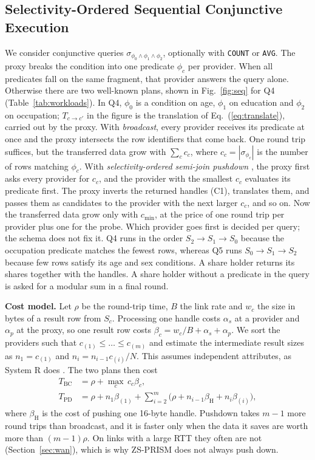 \documentclass[conference]{IEEEtran}
\newcommand{\sys}{ZS-PRISM}
\begin{document}
\subsection{Selectivity-Ordered Sequential Conjunctive Execution}\label{sec:query}
We consider conjunctive queries $\sigma_{\phi_0\wedge\phi_1\wedge\phi_2}$, optionally with \texttt{COUNT} or \texttt{AVG}. The proxy breaks the condition into one predicate $\phi_c$ per provider. When all predicates fall on the same fragment, that provider answers the query alone. Otherwise there are two well-known plans, shown in Fig.~\ref{fig:seq} for Q4 (Table~\ref{tab:workloads}). In Q4, $\phi_0$ is a condition on age, $\phi_1$ on education and $\phi_2$ on occupation; $T_{c\to c'}$ in the figure is the translation of Eq.~(\ref{eq:translate}), carried out by the proxy. With \emph{broadcast}, every provider receives its predicate at once and the proxy intersects the row identifiers that come back. One round trip suffices, but the transferred data grow with $\sum_c c_c$, where $c_c=|\sigma_{\phi_c}|$ is the number of rows matching $\phi_c$. With \emph{selectivity-ordered semi-join pushdown} \cite{bernstein1981semijoin}, the proxy first asks every provider for $c_c$, and the provider with the smallest $c_c$ evaluates its predicate first. The proxy inverts the returned handles (C1), translates them, and passes them as candidates to the provider with the next larger $c_c$, and so on. Now the transferred data grow only with $c_{\min}$, at the price of one round trip per provider plus one for the probe. Which provider goes first is decided per query; the schema does not fix it. Q4 runs in the order $S_2\to S_1\to S_0$ because the occupation predicate matches the fewest rows, whereas Q5 runs $S_0\to S_1\to S_2$ because few rows satisfy its age and sex conditions. A share holder returns its shares together with the handles. A share holder without a predicate in the query is asked for a modular sum in a final round.

\textbf{Cost model.} Let $\rho$ be the round-trip time, $B$ the link rate and $w_c$ the size in bytes of a result row from $S_c$. Processing one handle costs $\alpha_s$ at a provider and $\alpha_p$ at the proxy, so one result row costs $\beta_c=w_c/B+\alpha_s+\alpha_p$. We sort the providers such that $c_{(1)}\le\dots\le c_{(m)}$ and estimate the intermediate result sizes as $n_1=c_{(1)}$ and $n_i=n_{i-1}c_{(i)}/N$. This assumes independent attributes, as System R does \cite{selinger1979access}. The two plans then cost
\begin{align}
 T_{\mathrm{BC}} &= \rho + \textstyle\max_{c}\, c_c\beta_c,\label{eq:bc}\\
 T_{\mathrm{PD}} &= \rho + n_1\beta_{(1)} + \textstyle\sum_{i=2}^{m}\big(\rho + n_{i-1}\beta_{\mathrm{H}} + n_i\beta_{(i)}\big),\label{eq:pd}
\end{align}
where $\beta_{\mathrm{H}}$ is the cost of pushing one 16-byte handle. Pushdown takes $m-1$ more round trips than broadcast, and it is faster only when the data it saves are worth more than $(m-1)\rho$. On links with a large RTT they often are not (Section~\ref{sec:wan}), which is why \sys{} does not always push down.
\end{document}
